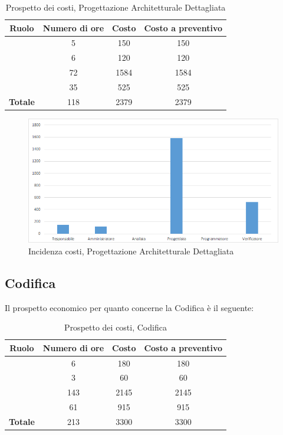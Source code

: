 \begin{table}[H]
	\begin{center}
		\begin{tabular}{|c|c|c|c|}
			\hline
			\textbf{Ruolo}	& \textbf{Numero di ore} & \textbf{Costo} & \textbf{Costo a preventivo}\\
			\hline
			\Res	&	5  &	150	  &	150\\
			\hline
			\Amm	&	6  &	120  &	120	\\
			\hline
			\Prog	&	72  &	1584  &	1584	\\
			\hline
			\Ver	&	35  &	525  &	525	\\
			\hline
			\textbf{Totale}  &	118 &	2379 &	2379	\\
			\hline
		\end{tabular}
	\end{center}
	\caption{Prospetto dei costi, Progettazione Architetturale Dettagliata }
\end{table}

\begin{figure}[H]
	\centering
	\includegraphics[scale=0.6]{img/8-3.png}
	\caption{Incidenza costi, Progettazione Architetturale Dettagliata}
\end{figure}

\subsection{Codifica}
Il prospetto economico per quanto concerne la Codifica è il seguente:


\begin{table}[H]
	\begin{center}
		\begin{tabular}{|c|c|c|c|}
			\hline
			\textbf{Ruolo}	& \textbf{Numero di ore} & \textbf{Costo} & \textbf{Costo a preventivo}\\
			\hline
			\Res	&	6  &	180  &	180	\\
			\hline
			\Amm	&	3  &	60  &	60	\\
			\hline
			\Progr	&	143  &	2145  &	2145	\\
			\hline
			\Ver	&	61  &	915  &	915		\\
			\hline
			\textbf{Totale}  &	213 &	3300 &	3300	\\
			\hline
		\end{tabular}
	\end{center}
	\caption{Prospetto dei costi, Codifica }
\end{table}


